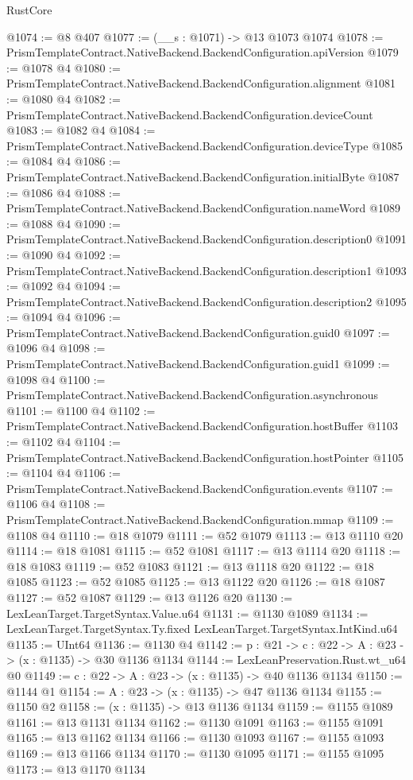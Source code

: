 \begin{lexlean}{RustCore}
\begin{coremodule}
@1074 := @8 @407
@1077 := (__s : @1071) -> @13 @1073 @1074
@1078 := PrismTemplateContract.NativeBackend.BackendConfiguration.apiVersion
@1079 := @1078 @4
@1080 := PrismTemplateContract.NativeBackend.BackendConfiguration.alignment
@1081 := @1080 @4
@1082 := PrismTemplateContract.NativeBackend.BackendConfiguration.deviceCount
@1083 := @1082 @4
@1084 := PrismTemplateContract.NativeBackend.BackendConfiguration.deviceType
@1085 := @1084 @4
@1086 := PrismTemplateContract.NativeBackend.BackendConfiguration.initialByte
@1087 := @1086 @4
@1088 := PrismTemplateContract.NativeBackend.BackendConfiguration.nameWord
@1089 := @1088 @4
@1090 := PrismTemplateContract.NativeBackend.BackendConfiguration.description0
@1091 := @1090 @4
@1092 := PrismTemplateContract.NativeBackend.BackendConfiguration.description1
@1093 := @1092 @4
@1094 := PrismTemplateContract.NativeBackend.BackendConfiguration.description2
@1095 := @1094 @4
@1096 := PrismTemplateContract.NativeBackend.BackendConfiguration.guid0
@1097 := @1096 @4
@1098 := PrismTemplateContract.NativeBackend.BackendConfiguration.guid1
@1099 := @1098 @4
@1100 := PrismTemplateContract.NativeBackend.BackendConfiguration.asynchronous
@1101 := @1100 @4
@1102 := PrismTemplateContract.NativeBackend.BackendConfiguration.hostBuffer
@1103 := @1102 @4
@1104 := PrismTemplateContract.NativeBackend.BackendConfiguration.hostPointer
@1105 := @1104 @4
@1106 := PrismTemplateContract.NativeBackend.BackendConfiguration.events
@1107 := @1106 @4
@1108 := PrismTemplateContract.NativeBackend.BackendConfiguration.mmap
@1109 := @1108 @4
@1110 := @18 @1079
@1111 := @52 @1079
@1113 := @13 @1110 @20
@1114 := @18 @1081
@1115 := @52 @1081
@1117 := @13 @1114 @20
@1118 := @18 @1083
@1119 := @52 @1083
@1121 := @13 @1118 @20
@1122 := @18 @1085
@1123 := @52 @1085
@1125 := @13 @1122 @20
@1126 := @18 @1087
@1127 := @52 @1087
@1129 := @13 @1126 @20
@1130 := LexLeanTarget.TargetSyntax.Value.u64
@1131 := @1130 @1089
@1134 := LexLeanTarget.TargetSyntax.Ty.fixed LexLeanTarget.TargetSyntax.IntKind.u64
@1135 := UInt64
@1136 := @1130 @4
@1142 := {p : @21} -> {c : @22} -> {A : @23} -> (x : @1135) -> @30 @1136 @1134
@1144 := LexLeanPreservation.Rust.wt_u64 @0
@1149 := {c : @22} -> {A : @23} -> (x : @1135) -> @40 @1136 @1134
@1150 := @1144 @1
@1154 := {A : @23} -> (x : @1135) -> @47 @1136 @1134
@1155 := @1150 @2
@1158 := (x : @1135) -> @13 @1136 @1134
@1159 := @1155 @1089
@1161 := @13 @1131 @1134
@1162 := @1130 @1091
@1163 := @1155 @1091
@1165 := @13 @1162 @1134
@1166 := @1130 @1093
@1167 := @1155 @1093
@1169 := @13 @1166 @1134
@1170 := @1130 @1095
@1171 := @1155 @1095
@1173 := @13 @1170 @1134

\end{coremodule}
\end{lexlean}
